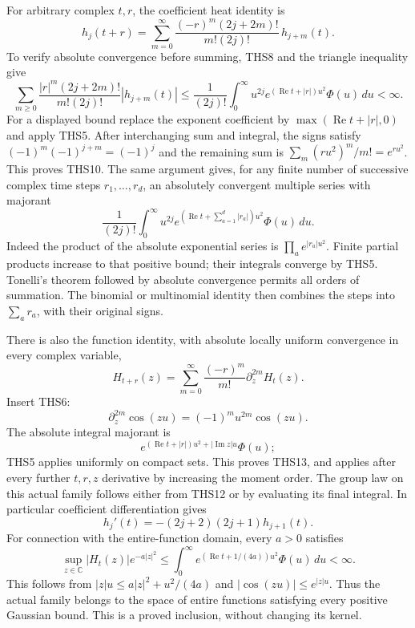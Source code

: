 \documentclass[11pt]{article}
\theoremstyle{definition}
\begin{document}
For arbitrary complex $t,r$, the coefficient heat identity is
\begin{equation}\tag{THS10}
 h_j(t+r)=\sum_{m=0}^{\infty}
       \frac{(-r)^m(2j+2m)!}{m!(2j)!}\,h_{j+m}(t).
\end{equation}
To verify absolute convergence before summing, THS8 and the
triangle inequality give
\begin{equation}\tag{THS11}
 \sum_{m\ge0}\frac{|r|^m(2j+2m)!}{m!(2j)!}|h_{j+m}(t)|
 \le\frac1{(2j)!}\int_0^\infty
      u^{2j}e^{(\operatorname{Re}t+|r|)u^2}\Phi(u)\,du<\infty.
\end{equation}
For a displayed bound replace the exponent coefficient by
$\max(\operatorname{Re}t+|r|,0)$ and apply THS5.
After interchanging sum and integral, the signs satisfy
$(-1)^m(-1)^{j+m}=(-1)^j$ and the remaining sum is
$\sum_m(ru^2)^m/m!=e^{ru^2}$. This proves THS10.
The same argument gives, for any finite number of successive
complex time steps $r_1,\ldots,r_d$, an absolutely convergent
multiple series with majorant
\begin{equation}\tag{THS12}
 \frac1{(2j)!}\int_0^\infty u^{2j}
 e^{(\operatorname{Re}t+\sum_{a=1}^d|r_a|)u^2}\Phi(u)\,du.
\end{equation}
Indeed the product of the absolute exponential series is
$\prod_a e^{|r_a|u^2}$. Finite partial products increase to
that positive bound; their integrals converge by THS5. Tonelli's
theorem followed by absolute convergence permits all orders of
summation. The binomial or multinomial identity then combines
the steps into $\sum_a r_a$, with their original signs.

There is also the function identity, with absolute locally
uniform convergence in every complex variable,
\begin{equation}\tag{THS13}
 H_{t+r}(z)=\sum_{m=0}^{\infty}\frac{(-r)^m}{m!}
                   \partial_z^{2m}H_t(z).
\end{equation}
Insert THS6:
\[
 \partial_z^{2m}\cos(zu)=(-1)^mu^{2m}\cos(zu).
\]
The absolute integral majorant is
\[
 e^{(\operatorname{Re}t+|r|)u^2+|\operatorname{Im}z|u}\Phi(u);
\]
THS5 applies uniformly on compact sets. This proves THS13,
and applies after every further $t,r,z$ derivative by increasing
the moment order. The group law on this actual family follows
either from THS12 or by evaluating its final integral.
In particular coefficient differentiation gives
\begin{equation}\tag{THS14}
 h_j'(t)=-(2j+2)(2j+1)h_{j+1}(t).
\end{equation}
For connection with the entire-function domain, every $a>0$
satisfies
\begin{equation}\tag{THS15}
 \sup_{z\in\mathbb C}|H_t(z)|e^{-a|z|^2}
 \le\int_0^\infty
        e^{(\operatorname{Re}t+1/(4a))u^2}\Phi(u)\,du<\infty.
\end{equation}
This follows from $|z|u\le a|z|^2+u^2/(4a)$ and
$|\cos(zu)|\le e^{|z|u}$. Thus the actual family belongs to
the space of entire functions satisfying every positive Gaussian
bound. This is a proved inclusion, without changing its kernel.
\end{document}
